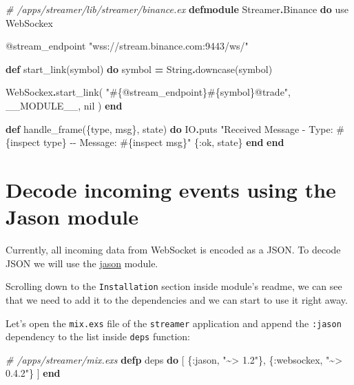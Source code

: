 \documentclass[
]{book}
\newenvironment{Shaded}{\begin{snugshade}}{\end{snugshade}}
\newcommand{\CommentTok}[1]{\textcolor[rgb]{0.56,0.35,0.01}{\textit{#1}}}
\newcommand{\ConstantTok}[1]{\textcolor[rgb]{0.00,0.00,0.00}{#1}}
\newcommand{\ImportTok}[1]{#1}
\newcommand{\KeywordTok}[1]{\textcolor[rgb]{0.13,0.29,0.53}{\textbf{#1}}}
\newcommand{\NormalTok}[1]{#1}
\newcommand{\OperatorTok}[1]{\textcolor[rgb]{0.81,0.36,0.00}{\textbf{#1}}}
\newcommand{\OtherTok}[1]{\textcolor[rgb]{0.56,0.35,0.01}{#1}}
\newcommand{\StringTok}[1]{\textcolor[rgb]{0.31,0.60,0.02}{#1}}
\newcommand{\VariableTok}[1]{\textcolor[rgb]{0.00,0.00,0.00}{#1}}
\begin{document}
\begin{Shaded}
\begin{Highlighting}[]
\CommentTok{\# /apps/streamer/lib/streamer/binance.ex}
\KeywordTok{defmodule} \ConstantTok{Streamer}\OperatorTok{.}\ConstantTok{Binance} \KeywordTok{do}
  \ImportTok{use} \ConstantTok{WebSockex}

  \OtherTok{@stream\_endpoint} \StringTok{"wss://stream.binance.com:9443/ws/"}

  \KeywordTok{def}\NormalTok{ start\_link(symbol) }\KeywordTok{do}
\NormalTok{    symbol }\OperatorTok{=} \ConstantTok{String}\OperatorTok{.}\NormalTok{downcase(symbol)}

    \ConstantTok{WebSockex}\OperatorTok{.}\NormalTok{start\_link(}
      \StringTok{"}\OtherTok{\#\{@stream\_endpoint\}\#\{}\NormalTok{symbol}\OtherTok{\}}\StringTok{@trade"}\NormalTok{,}
      \ConstantTok{\_\_MODULE\_\_}\NormalTok{,}
      \ConstantTok{nil}
\NormalTok{    )}
  \KeywordTok{end}

  \KeywordTok{def}\NormalTok{ handle\_frame(\{type, msg\}, state) }\KeywordTok{do}
    \ConstantTok{IO}\OperatorTok{.}\NormalTok{puts }\StringTok{"Received Message {-} Type: }\OtherTok{\#\{}\NormalTok{inspect type}\OtherTok{\}}\StringTok{ {-}{-} Message: }\OtherTok{\#\{}\NormalTok{inspect msg}\OtherTok{\}}\StringTok{"}
\NormalTok{    \{}\VariableTok{:ok}\NormalTok{, state\}}
  \KeywordTok{end}
\KeywordTok{end}
\end{Highlighting}
\end{Shaded}

\hypertarget{decode-incoming-events-using-the-jason-module}{%
\section{Decode incoming events using the Jason module}\label{decode-incoming-events-using-the-jason-module}}

Currently, all incoming data from WebSocket is encoded as a JSON. To decode JSON we will use the \href{https://github.com/michalmuskala/jason}{jason} module.

Scrolling down to the \texttt{Installation} section inside module's readme, we can see that we need to add it to the dependencies and we can start to use it right away.

Let's open the \texttt{mix.exs} file of the \texttt{streamer} application and append the \texttt{:jason} dependency to the list inside \texttt{deps} function:

\begin{Shaded}
\begin{Highlighting}[]
  \CommentTok{\# /apps/streamer/mix.exs}
  \KeywordTok{defp}\NormalTok{ deps }\KeywordTok{do}
\NormalTok{    [}
\NormalTok{      \{}\VariableTok{:jason}\NormalTok{, }\StringTok{"\textasciitilde{}\textgreater{} 1.2"}\NormalTok{\},}
\NormalTok{      \{}\VariableTok{:websockex}\NormalTok{, }\StringTok{"\textasciitilde{}\textgreater{} 0.4.2"}\NormalTok{\}}
\NormalTok{    ]}
  \KeywordTok{end}
\end{Highlighting}
\end{Shaded}
\end{document}
